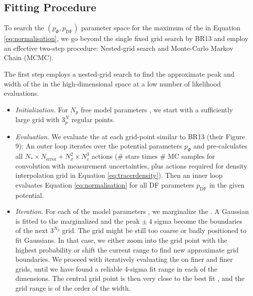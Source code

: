 \subsection{Fitting Procedure} \label{sec:fitting}

To search the $(p_\Phi,p_\text{DF})$ parameter space for the maximum of the \pdf{} in Equation \ref{eq:normalisation}, we go beyond the single fixed grid search by BR13 and employ an effective two-step procedure: Nested-grid search and Monte-Carlo Markov Chain (MCMC).

The first step employs a nested-grid search to find the approximate peak and width of the \pdf{} in the high-dimensional \pmodel{}  space at a low number of likelihood evaluations.

\begin{itemize}
\item \emph{Initialization.} For $N_p$ free model parameters \pmodel{}, we start with a sufficiently large grid with $3^N_p$ regular points.

\item  \emph{Evaluation.} We evaluate the \pdf{} at each grid-point similar to BR13 (their Figure 9):  An outer loop iterates over the potential parameters $p_\Phi$ and pre-calculates all $N_* \times N_\text{error} + N_x^2 \times N_v^3$ actions (\# stars times \# MC samples for convolution with measurement uncertainties, plus actions required for density interpolation grid in Equation \ref{eq:tracerdensity}). Then an inner loop evaluates Equation \ref{eq:normalisation} for all DF parameters $p_\text{DF}$ in the given potential.

\item \emph{Iteration.} For each of the model parameters \pmodel{}, we marginalize the \pdf{}. A Gaussian is fitted to the marginalized \pdf{} and the peak $\pm ~ 4$ sigma become the boundaries of the next $3^{N_p}$ grid. The grid might be still too coarse or badly positioned to fit Gaussians. In that case, we either zoom into the grid point with the highest probability or shift the current range to find new approximate grid boundaries. We proceed with iteratively evaluating the \pdf{} on finer and finer grids, until we have found a reliable 4-sigma fit range in each of the \pmodel{} dimensions. The central grid point is then very close to the best fit \pmodel{}, and the grid range is of the order of the \pdf{} width.


\end{itemize}
